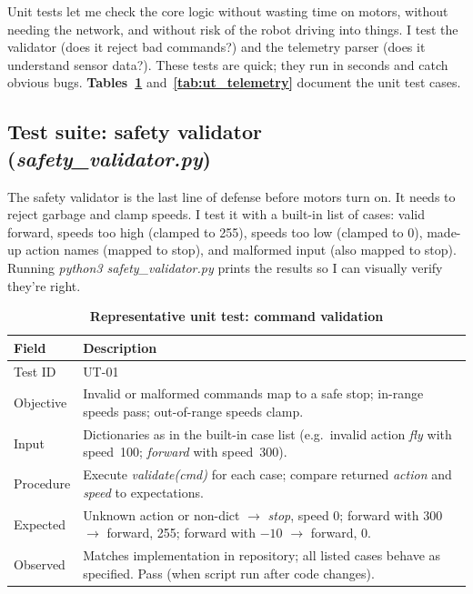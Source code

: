 Unit tests let me check the core logic without wasting time on motors, without needing the network, and without risk of the robot driving into things. I test the validator (does it reject bad commands?) and the telemetry parser (does it understand sensor data?). These tests are quick; they run in seconds and catch obvious bugs. \textbf{Tables~\ref{tab:ut_validator}} and~\textbf{\ref{tab:ut_telemetry}} document the unit test cases.

\subsection[Validator module]{Test suite: safety validator (\textit{safety\_validator.py})}
\label{subsec:ut_validator}

The safety validator is the last line of defense before motors turn on. It needs to reject garbage and clamp speeds. I test it with a built-in list of cases: valid forward, speeds too high (clamped to 255), speeds too low (clamped to 0), made-up action names (mapped to stop), and malformed input (also mapped to stop). Running \textit{python3 safety\_validator.py} prints the results so I can visually verify they're right.


\begin{table}[H]
\centering
\caption[Representative unit test: command validation]{\textbf{Representative unit test: command validation}}
\label{tab:ut_validator}
\begin{tabularx}{\textwidth}{|>{\raggedright\arraybackslash}p{3.1cm}|X|}
\hline
\textbf{Field} & \textbf{Description} \\
\hline
Test ID & UT-01 \\ \hline
Objective & Invalid or malformed commands map to a safe stop; in-range speeds pass; out-of-range speeds clamp. \\ \hline
Input & Dictionaries as in the built-in case list (e.g.\ invalid action \textit{fly} with speed~100; \textit{forward} with speed~300). \\ \hline
Procedure & Execute \textit{validate(cmd)} for each case; compare returned \textit{action} and \textit{speed} to expectations. \\ \hline
Expected & Unknown action or non-dict $\rightarrow$ \textit{stop}, speed 0; forward with 300 $\rightarrow$ forward, 255; forward with $-10$ $\rightarrow$ forward, 0. \\ \hline
Observed & Matches implementation in repository; all listed cases behave as specified. Pass (when script run after code changes). \\
\hline
\end{tabularx}
\end{table}

